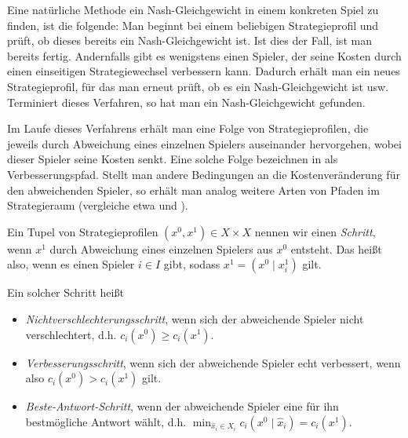 Eine natürliche Methode ein Nash-Gleichgewicht in einem konkreten Spiel zu finden, ist die folgende: Man beginnt bei einem beliebigen Strategieprofil und prüft, ob dieses bereits ein Nash-Gleichgewicht ist. Ist dies der Fall, ist man bereits fertig. Andernfalls gibt es wenigstens einen Spieler, der seine Kosten durch einen einseitigen Strategiewechsel verbessern kann. Dadurch erhält man ein neues Strategieprofil, für das man erneut prüft, ob es ein Nash-Gleichgewicht ist usw. Terminiert dieses Verfahren, so hat man ein Nash-Gleichgewicht gefunden. 

Im Laufe dieses Verfahrens erhält man eine Folge von Strategieprofilen, die jeweils durch Abweichung eines einzelnen Spielers auseinander hervorgehen, wobei dieser Spieler seine Kosten senkt. Eine solche Folge bezeichnen \citeauthor{MonShap} in \cite{MonShap} als \glqq Verbesserungspfad\grqq. Stellt man andere Bedingungen an die Kostenveränderung für den abweichenden Spieler, so erhält man analog weitere Arten von Pfaden im Strategieraum (vergleiche etwa \cite{CharExOrdPot} und \cite{BestRespPot}).

\begin{defn}\label{defn:Schritte}
	Ein Tupel von Strategieprofilen $(x^0, x^1) \in X\times X$ nennen wir einen \emph{Schritt}, wenn $x^1$ durch Abweichung eines einzelnen Spielers aus $x^0$ entsteht. Das heißt also, wenn es einen Spieler $i \in I$ gibt, sodass $x^1 = (x^0 \mid x^1_i)$ gilt. 
	
	Ein solcher Schritt heißt
	\begin{itemize}
		\item \emph{Nichtverschlechterungsschritt}, wenn sich der abweichende Spieler nicht verschlechtert, d.h. $c_i(x^0) \geq c_i(x^1)$.
		\item \emph{Verbesserungsschritt}, wenn sich der abweichende Spieler echt verbessert, wenn also $c_i(x^0) > c_i(x^1)$ gilt.
		\item \emph{Beste-Antwort-Schritt}, wenn der abweichende Spieler eine für ihn bestmögliche Antwort wählt, d.h. $\min_{\hat{x}_i \in X_i} c_i(x^0 \mid \hat{x}_i) = c_i(x^1)$.		
	\end{itemize}
\end{defn}

